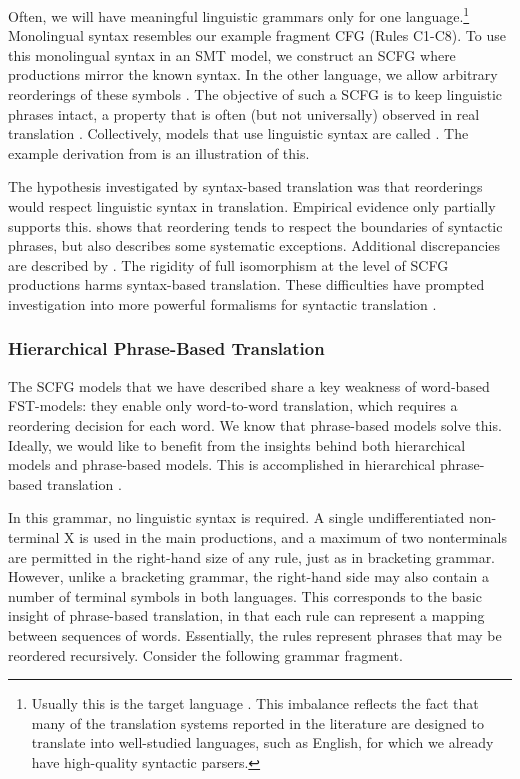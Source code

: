 Often, we will have meaningful linguistic grammars
only for one language.\footnote{Usually
this is the target language \citep{Wu:1998:acl,Yamada:2002:acl}.
This imbalance reflects the fact that many of the
translation systems reported in the literature
are designed to translate into well-studied
languages, such as English, for which we
already have high-quality syntactic parsers.
}
Monolingual syntax resembles our
example fragment CFG (Rules C1-C8).  To use
this monolingual syntax in an SMT model, 
we construct an SCFG where productions 
mirror the known syntax.  In the other language,
we allow arbitrary reorderings of these symbols
\citep{Wu:1998:acl,Yamada:2001:acl}.  The objective 
of such a SCFG is to keep linguistic phrases intact, a property that is often (but not universally) observed in real translation \citep{Fox:2002:emnlp,Wellington:2006:acl-coling}. 
Collectively, models that use linguistic syntax are called
. 
The example derivation from 
is an illustration of this.  

The hypothesis investigated by syntax-based translation
was that reorderings would respect linguistic
syntax in translation.  
Empirical evidence only partially supports this.  
\citet{Fox:2002:emnlp} shows that reordering tends to
respect the boundaries of syntactic phrases, but also
describes some systematic exceptions.  Additional
discrepancies are described by \citet{Wellington:2006:acl-coling}.
The rigidity of full isomorphism at the level of SCFG
productions harms syntax-based translation.  These difficulties
have prompted investigation into more powerful formalisms
for syntactic translation 
\citep{Galley:2004:naacl,Knight:2005:cicling,Galley:2006:acl}.

\subsubsection{Hierarchical Phrase-Based Translation}\label{sec:hiero}

The SCFG models that we have described share
a key weakness of word-based FST-models: they enable only
word-to-word translation, which requires a reordering
decision for each word.  We know that phrase-based models
solve this.  Ideally, we would like to benefit
from the insights behind both hierarchical models and 
phrase-based models.  This is accomplished in hierarchical
phrase-based translation \citep{Chiang:2007:cl,Chiang:2005:acl,Chiang:2005:hlt}.

In this grammar, no linguistic syntax is required. 
A single undifferentiated
non-terminal X is used in the main productions, 
and a maximum of two nonterminals are permitted in
the right-hand size of any rule, just as in bracketing grammar.  
However, unlike a bracketing grammar, 
the right-hand side may also contain a number
of terminal symbols in both languages.  This corresponds
to the basic insight of phrase-based translation, in that 
each rule can represent a mapping between sequences of words.
Essentially, the rules represent phrases that may 
be reordered recursively.  Consider the
following grammar fragment.

